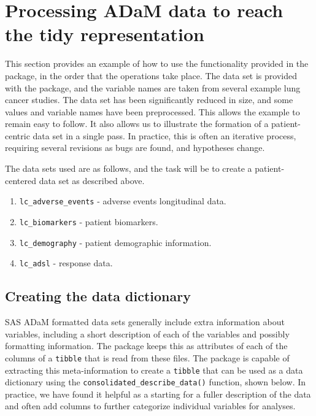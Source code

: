 \hypertarget{processing-adam-data-to-reach-the-tidy-representation}{%
\section{Processing ADaM data to reach the tidy
representation}\label{processing-adam-data-to-reach-the-tidy-representation}}

This section provides an example of how to use the functionality
provided in the  package, in the order that the operations
take place. The data set is provided with the package, and the variable
names are taken from several example lung cancer studies. The data set
has been significantly reduced in size, and some values and variable
names have been preprocessed. This allows the example to remain easy to
follow. It also allows us to illustrate the formation of a
patient-centric data set in a single pass. In practice, this is often an
iterative process, requiring several revisions as bugs are found, and
hypotheses change.

The data sets used are as follows, and the task will be to create a
patient-centered data set as described above.

\begin{enumerate}
\def\labelenumi{\arabic{enumi}.}
\tightlist
\item
  \texttt{lc\_adverse\_events} - adverse events longitudinal data.
\item
  \texttt{lc\_biomarkers} - patient biomarkers.
\item
  \texttt{lc\_demography} - patient demographic information.
\item
  \texttt{lc\_adsl} - response data.
\end{enumerate}

\hypertarget{creating-the-data-dictionary}{%
\subsection{Creating the data
dictionary}\label{creating-the-data-dictionary}}

SAS ADaM formatted data sets generally include extra information about
variables, including a short description of each of the variables and
possibly formatting information. The  package keeps this as
attributes of each of the columns of a \texttt{tibble} that is read from
these files. The  package is capable of extracting this
meta-information to create a \texttt{tibble} that can be used as a data
dictionary using the \texttt{consolidated\_describe\_data()} function,
shown below. In practice, we have found it helpful as a starting for a
fuller description of the data and often add columns to further
categorize individual variables for analyses.

